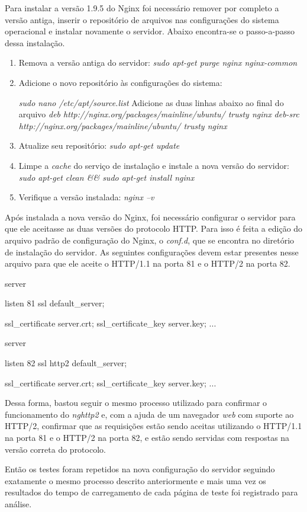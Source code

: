 Para instalar a versão 1.9.5 do Nginx foi necessário remover por completo a versão antiga, inserir o repositório de arquivos nas configurações do sistema operacional e instalar novamente o servidor. Abaixo encontra-se o passo-a-passo dessa instalação.

\begin{enumerate}
	\item Remova a versão antiga do servidor: \textit{sudo apt-get purge nginx nginx-common}
	\item Adicione o novo repositório às configurações do sistema:
		\begin{center}
			\textit{sudo nano /etc/apt/source.list}
			Adicione as duas linhas abaixo ao final do arquivo
			\textit{deb http://nginx.org/packages/mainline/ubuntu/ trusty nginx}
			\textit{deb-src http://nginx.org/packages/mainline/ubuntu/ trusty nginx}
		\end{center}
	\item Atualize seu repositório: \textit{sudo apt-get update}
	\item Limpe a \textit{cache} do serviço de instalação e instale a nova versão do servidor: \textit{sudo apt-get clean \&\& sudo apt-get install nginx}
	\item Verifique a versão instalada: \textit{nginx --v}
\end{enumerate}

Após instalada a nova versão do Nginx, foi necessário configurar o servidor para que ele aceitasse as duas versões do protocolo HTTP. Para isso é feita a edição do arquivo padrão de configuração do Nginx, o \textit{conf.d}, que se encontra no diretório de instalação do servidor. As seguintes configurações devem estar presentes nesse arquivo para que ele aceite o HTTP/1.1 na porta 81 e o HTTP/2 na porta 82.

\begin{center}
server {
    listen 81 ssl default\_server;

    ssl\_certificate    server.crt;
    ssl\_certificate\_key server.key;
    ...
}

server {
    listen 82 ssl http2 default\_server;

    ssl\_certificate    server.crt;
    ssl\_certificate\_key server.key;
    ...
}
\end{center}

Dessa forma, bastou seguir o mesmo processo utilizado para confirmar o funcionamento do \textit{nghttp2} e, com a ajuda de um navegador \textit{web} com suporte ao HTTP/2, confirmar que as requisições estão sendo aceitas utilizando o HTTP/1.1 na porta 81 e o HTTP/2 na porta 82, e estão sendo servidas com respostas na versão correta do protocolo.

Então os testes foram repetidos na nova configuração do servidor seguindo exatamente o mesmo processo descrito anteriormente e mais uma vez os resultados do tempo de carregamento de cada página de teste foi registrado para análise.